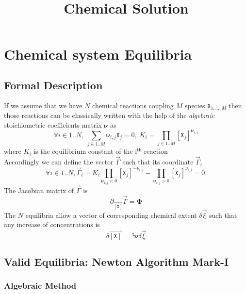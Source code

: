 \documentclass[aps,twocolumn]{revtex4}
\newcommand{\myconc}[1]{\left\lbrack #1 \right\rbrack}
\newcommand{\mychem}[1]{{\mathtt{#1}}}
\newcommand{\species}{\mychem{X}}
\newcommand{\mymat}[1]{\boldsymbol{#1}}
\newcommand{\mytrn}[1]{{\!\!~^{\mathsf{t}}{#1}}}
\newcommand{\myvec}[1]{\overrightarrow{#1}}
\newcommand{\vecX}{\myvec{\myconc{\mychem{X}}}}
\begin{document}
\title{Chemical Solution}


\maketitle

\section{Chemical system Equilibria}
\subsection{Formal Description}
If we assume that we have $N$ chemical reactions coupling $M$ species $\species_{1,\ldots,M}$ then those reactions can be classically written with the help
of the \textit{algebraic} stoichiometric coefficients matrix $\mymat{\nu}$ as
\begin{equation}
	\label{eq:Ki}
	\forall i \in 1..N, \; \sum_{j\in1..M} \mymat{\nu}_{i,j} \species_j = 0, \; K_i=\prod_{j\in1..M} \myconc{\species_j}^{\mymat{\nu}_{i,j}}
\end{equation}
where $K_i$ is the equilibrium constant of the i$^{\text{th}}$ reaction\\
Accordingly we can define the vector $\vec{\Gamma}$ such that its coordinate $\vec{\Gamma}_i$
\begin{equation}
	\label{eq:Gamma}
	\forall i \in 1..N, \vec{\Gamma}_i = K_i \prod_{\mymat{\nu}_{i,j}<0} \myconc{\species_j}^{-\nu_{i,j}} - \prod_{\mymat{\nu}_{i,j}>0} \myconc{\species_j}^{\nu_{i,j}} = 0.
\end{equation}
The Jacobian matrix of $\vec{\Gamma}$ is
\begin{equation}
	\partial_{\vecX} \vec{\Gamma} = \mymat{\Phi}
\end{equation}
The $N$ equilibria allow a vector of corresponding chemical extent $\delta\vec{\xi}$ such that any increase of concentrations is
\begin{equation}
	\delta\vecX = \mytrn{\mymat{\nu}} \delta\vec{\xi}
\end{equation}

\subsection{Valid Equilibria: Newton Algorithm Mark-I}
\subsubsection{Algebraic Method}
\end{document}
